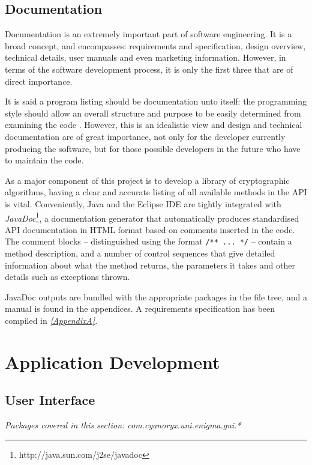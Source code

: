 \subsection{Documentation}

Documentation is an extremely important part of software engineering. It is a broad concept, and encompasses: requirements and specification, design overview, technical details, user manuals and even marketing information. However, in terms of the software development process, it is only the first three that are of direct importance. 

It is said a program listing should be documentation unto itself: the programming style should allow an overall structure and purpose to be easily determined from examining the code \cite{McConnell:2004tv}. However, this is an idealistic view and design and technical documentation are of great importance, not only for the developer currently producing the software, but for those possible developers in the future who have to maintain the code.

As a major component of this project is to develop a library of cryptographic algorithms, having a clear and accurate listing of all available methods in the API is vital. Conveniently, Java and the Eclipse IDE are tightly integrated with \emph{JavaDoc}\footnote{http://java.sun.com/j2se/javadoc}, a documentation generator that automatically produces standardised API documentation in HTML format based on comments inserted in the code. The comment blocks -- distinguished using the format \verb!/** ... */! -- contain a method description, and a number of control sequences that give detailed information about what the method returns, the parameters it takes and other details such as exceptions thrown.

JavaDoc outputs are bundled with the appropriate packages in the file tree, and a manual is found in the appendices. A requirements specification has been compiled in \emph{\textsection \ref{AppendixA}}.

\section{Application Development}

  \subsection{User Interface}
  \emph{Packages covered in this section: com.cyanoryx.uni.enigma.gui.*}
  
